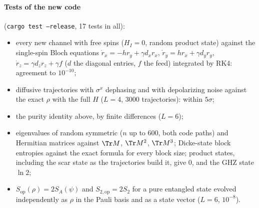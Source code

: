\paragraph{Tests of the new code} (\texttt{cargo test --release}, 17 tests in all):
\begin{itemize}
\item every new channel with free spins ($H_I = 0$, random product state) against the single-spin Bloch equations $\dot r_x = -hr_y + \gamma d_xr_x$, $\dot r_y = hr_x + \gamma d_yr_y$, $\dot r_z = \gamma d_zr_z + \gamma f$ ($d$ the diagonal entries, $f$ the feed) integrated by RK4: agreement to $10^{-10}$;
\item diffusive trajectories with $\sigma^x$ dephasing and with depolarizing noise against the exact $\rho$ with the full $H$ ($L = 4$, 3000 trajectories): within $5\sigma$;
\item the purity identity above, by finite differences ($L = 6$);
\item eigenvalues of random symmetric ($n$ up to $600$, both code paths) and Hermitian matrices against $\Tr M$, $\Tr M^2$, $\Tr M^3$; Dicke-state block entropies against the exact formula for every block size; product states, including the scar state as the trajectories build it, give $0$, and the GHZ state $\ln 2$;
\item $S_{\mathrm{op}}(\rho) = 2S_A(\psi)$ and $S_{2,\mathrm{op}} = 2S_2$ for a pure entangled state evolved independently as $\rho$ in the Pauli basis and as a state vector ($L = 6$, $10^{-8}$).
\end{itemize}
